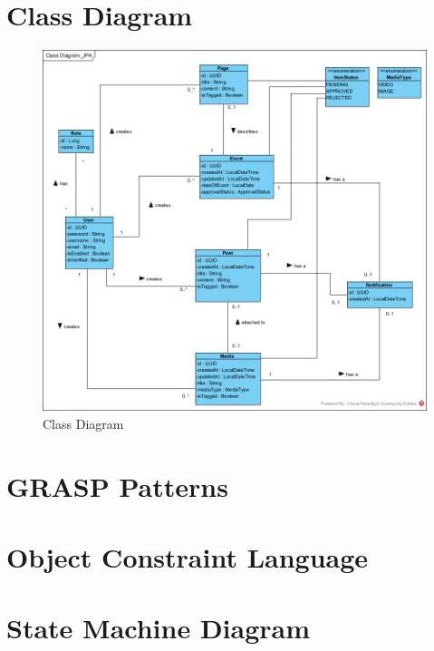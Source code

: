 \documentclass{article}
\begin{document}
\section{Class Diagram}
\begin{figure}[H]
    \centering
    \includegraphics[width=.98\textwidth]{images/ClassDiagram.png}
    \centering
    \caption{Class Diagram}
\end{figure}
\section{GRASP Patterns}


\section{Object Constraint Language}


\section{State Machine Diagram}
\end{document}
